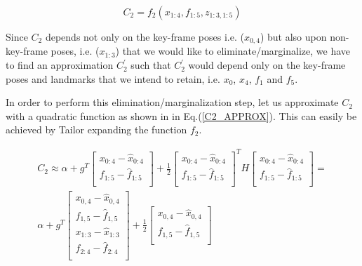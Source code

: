 \begin{equation}
C_2 = f_2(x_{1:4}, f_{1:5}, z_{1:3, 1:5})
\label{FULL_C2_COST}
\end{equation}

Since $C_2$ depends not only on the key-frame poses i.e. ($x_{0,4}$) but also upon non-key-frame poses, i.e. ($x_{1:3}$) that we would like to eliminate/marginalize, we have to find an approximation $C_2^{'}$ such that $C_2^{'}$ would depend only on the key-frame poses and landmarks that we intend to retain, i.e. $x_0$, $x_4$, $f_1$ and $f_5$. 

In order to perform this elimination/marginalization step, let us approximate $C_2$ with a quadratic function as shown in in Eq.(\ref{C2_APPROX}). This can easily be achieved by Tailor expanding the function $f_2$.

\begin{equation}
\begin{split}
C_2 \approx \alpha + g^T\begin{bmatrix} x_{0:4} - \hat x_{0:4} \\ 
                                  f_{1:5} - \hat f_{1:5}\\
									\end{bmatrix} 
									+ \frac{1}{2} \begin{bmatrix} x_{0:4} - \hat x_{0:4} \\ 
                                        f_{1:5} - \hat f_{1:5}\\
									              \end{bmatrix}^T H 
												\begin{bmatrix} x_{0:4} - \hat x_{0:4} \\ 
                                        f_{1:5} - \hat f_{1:5}\\
									      \end{bmatrix} = \\
		\alpha + g^T\begin{bmatrix} x_{0,4} - \hat x_{0,4}\\ 
                                f_{1,5} - \hat f_{1,5}\\
																x_{1:3} - \hat x_{1:3}\\ 
                                f_{2:4} - \hat f_{2:4}\\
									\end{bmatrix} 
									+ \frac{1}{2} \begin{bmatrix} x_{0,4} - \hat x_{0,4}\\ 
                                                f_{1,5} - \hat f_{1,5}\\

\end{bmatrix}
\end{split}
\end{equation}
